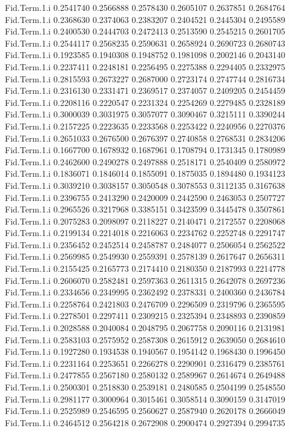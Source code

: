 \documentclass[11pt]{article} %
\begin{document}
\begin{Schunk}
\begin{Soutput}
Fid.Term.1.i 0.2541740 0.2566888 0.2578430 0.2605107 0.2637851 0.2684764
Fid.Term.1.i 0.2368630 0.2374063 0.2383207 0.2404521 0.2445304 0.2495589
Fid.Term.1.i 0.2400530 0.2444703 0.2472413 0.2513590 0.2545215 0.2601705
Fid.Term.1.i 0.2544117 0.2568235 0.2590631 0.2658924 0.2690723 0.2680743
Fid.Term.1.i 0.1923585 0.1940308 0.1948752 0.1981098 0.2002146 0.2043140
Fid.Term.1.i 0.2237411 0.2248181 0.2256495 0.2275388 0.2294405 0.2332975
Fid.Term.1.i 0.2815593 0.2673227 0.2687000 0.2723174 0.2747744 0.2816734
Fid.Term.1.i 0.2316130 0.2331471 0.2369517 0.2374057 0.2409205 0.2454459
Fid.Term.1.i 0.2208116 0.2220547 0.2231324 0.2254269 0.2279485 0.2328189
Fid.Term.1.i 0.3000039 0.3031975 0.3057077 0.3090467 0.3215111 0.3390244
Fid.Term.1.i 0.2157225 0.2223635 0.2233568 0.2253422 0.2240956 0.2270376
Fid.Term.1.i 0.2651033 0.2676500 0.2676397 0.2740858 0.2768531 0.2834206
Fid.Term.1.i 0.1667700 0.1678932 0.1687961 0.1708794 0.1731345 0.1780989
Fid.Term.1.i 0.2462600 0.2490278 0.2497888 0.2518171 0.2540409 0.2580972
Fid.Term.1.i 0.1836071 0.1846014 0.1855091 0.1875035 0.1894480 0.1934123
Fid.Term.1.i 0.3039210 0.3038157 0.3050548 0.3078553 0.3112135 0.3167638
Fid.Term.1.i 0.2396755 0.2413290 0.2420009 0.2442590 0.2463053 0.2507727
Fid.Term.1.i 0.2965526 0.3217968 0.3385151 0.3423599 0.3445478 0.3507861
Fid.Term.1.i 0.2075283 0.2098097 0.2118227 0.2140471 0.2172557 0.2208068
Fid.Term.1.i 0.2199134 0.2214018 0.2216063 0.2234762 0.2252748 0.2291747
Fid.Term.1.i 0.2356452 0.2452514 0.2458787 0.2484077 0.2506054 0.2562522
Fid.Term.1.i 0.2569985 0.2549930 0.2559391 0.2578139 0.2617647 0.2656311
Fid.Term.1.i 0.2155425 0.2165773 0.2174410 0.2180350 0.2187993 0.2214778
Fid.Term.1.i 0.2606070 0.2582481 0.2597363 0.2611315 0.2642078 0.2697236
Fid.Term.1.i 0.2334656 0.2349995 0.2362492 0.2378331 0.2400360 0.2436784
Fid.Term.1.i 0.2258764 0.2421803 0.2476709 0.2296509 0.2319796 0.2365595
Fid.Term.1.i 0.2278501 0.2297411 0.2309215 0.2325394 0.2348893 0.2390859
Fid.Term.1.i 0.2028588 0.2040084 0.2048795 0.2067758 0.2090116 0.2131981
Fid.Term.1.i 0.2583103 0.2575952 0.2587308 0.2615912 0.2639050 0.2684610
Fid.Term.1.i 0.1927280 0.1934538 0.1940567 0.1954142 0.1968430 0.1996450
Fid.Term.1.i 0.2231164 0.2253651 0.2266278 0.2290901 0.2316479 0.2385761
Fid.Term.1.i 0.2477855 0.2567180 0.2580132 0.2589967 0.2614674 0.2649488
Fid.Term.1.i 0.2500301 0.2518830 0.2539181 0.2480585 0.2504199 0.2548550
Fid.Term.1.i 0.2981177 0.3000964 0.3015461 0.3058514 0.3090159 0.3147019
Fid.Term.1.i 0.2525989 0.2546595 0.2560627 0.2587940 0.2620178 0.2666049
Fid.Term.1.i 0.2464512 0.2564218 0.2672908 0.2900474 0.2927394 0.2994735

\end{Soutput}
\end{Schunk}
\end{document}
